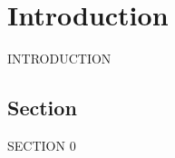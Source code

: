 
\setcounter{chapter}{0}

\chapter{Introduction}
\label{chap:introduction}

INTRODUCTION

\section{Section}

SECTION 0